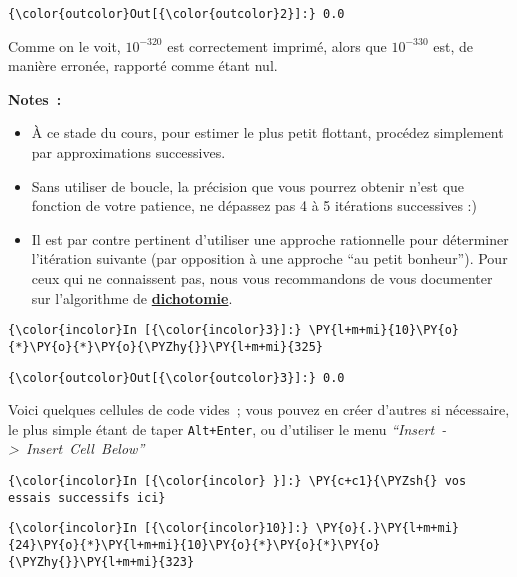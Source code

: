 \begin{Verbatim}[commandchars=\\\{\}]
{\color{outcolor}Out[{\color{outcolor}2}]:} 0.0
\end{Verbatim}
            
    Comme on le voit, \(10^{-320}\) est correctement imprimé, alors que
\(10^{-330}\) est, de manière erronée, rapporté comme étant nul.

    \textbf{Notes~:}

\begin{itemize}
\item
  À ce stade du cours, pour estimer le plus petit flottant, procédez
  simplement par approximations successives.
\item
  Sans utiliser de boucle, la précision que vous pourrez obtenir n'est
  que fonction de votre patience, ne dépassez pas 4 à 5 itérations
  successives :)
\item
  Il est par contre pertinent d'utiliser une approche rationnelle pour
  déterminer l'itération suivante (par opposition à une approche ``au
  petit bonheur''). Pour ceux qui ne connaissent pas, nous vous
  recommandons de vous documenter sur l'algorithme de
  \href{https://fr.wikipedia.org/wiki/Recherche_dichotomique}{\textbf{dichotomie}}.
\end{itemize}

    \begin{Verbatim}[commandchars=\\\{\}]
{\color{incolor}In [{\color{incolor}3}]:} \PY{l+m+mi}{10}\PY{o}{*}\PY{o}{*}\PY{o}{\PYZhy{}}\PY{l+m+mi}{325}
\end{Verbatim}


\begin{Verbatim}[commandchars=\\\{\}]
{\color{outcolor}Out[{\color{outcolor}3}]:} 0.0
\end{Verbatim}
            
    Voici quelques cellules de code vides~; vous pouvez en créer d'autres si
nécessaire, le plus simple étant de taper \texttt{Alt+Enter}, ou
d'utiliser le menu \emph{``Insert~-\textgreater{}~Insert~Cell~Below''}

    \begin{Verbatim}[commandchars=\\\{\}]
{\color{incolor}In [{\color{incolor} }]:} \PY{c+c1}{\PYZsh{} vos essais successifs ici}
\end{Verbatim}


    \begin{Verbatim}[commandchars=\\\{\}]
{\color{incolor}In [{\color{incolor}10}]:} \PY{o}{.}\PY{l+m+mi}{24}\PY{o}{*}\PY{l+m+mi}{10}\PY{o}{*}\PY{o}{*}\PY{o}{\PYZhy{}}\PY{l+m+mi}{323}
\end{Verbatim}


